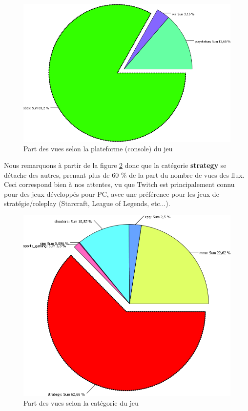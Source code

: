 \documentclass[11pt, a4paper, titlepage]{scrartcl}
\begin{document}
\begin{figure}[h]
    \centering
    \includegraphics[width=\textwidth]{images/main_consoles}
    \caption{Part des vues selon la plateforme (console) du jeu}
    \label{fig:main_consoles}
\end{figure}

Nous remarquons à partir de la figure \ref{fig:main_categories} donc que la
catégorie \textbf{strategy} se détache des autres, prenant plus de 60 \% de la
part du nombre de vues des flux. Ceci correspond bien à nos attentes, vu que
Twitch est principalement connu pour des jeux développés pour PC, avec une
préférence pour les jeux de stratégie/roleplay (Starcraft, League of Legends,
etc...).

\begin{figure}[h]
    \centering
    \includegraphics[width=\textwidth]{images/main_categories}
    \caption{Part des vues selon la catégorie du jeu}
    \label{fig:main_categories}
\end{figure}
\end{document}

